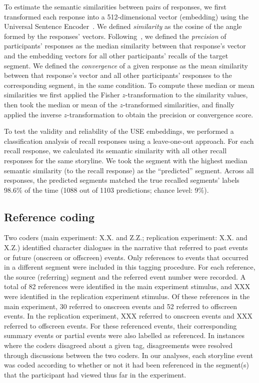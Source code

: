 \documentclass[10pt]{article}
\begin{document}
To estimate the semantic similarities between pairs of responses, we first
transformed each response into a 512-dimensional vector (embedding) using the
Universal Sentence Encoder~\citep[Transformer USE, ][]{CerEtal18}. We defined
\textit{similarity} as the cosine of the angle formed by the responses'
vectors. Following~\cite{HeusEtal21}, we defined the \textit{precision} of
participants' responses as the median similarity between that response's vector
and the embedding vectors for all other participants' recalls of the target
segment. We defined the \textit{convergence} of a given response as the mean
similarity between that response's vector and all other participants' responses
to the corresponding segment, in the same condition. To compute these median or
mean similarities we first applied the Fisher $z$-transformation to the
similarity values, then took the median or mean of the $z$-transformed
similarities, and finally applied the inverse $z$-transformation to obtain the
precision or convergence score.

To test the validity and reliability of the USE embeddings, we performed a
classification analysis of recall responses using a leave-one-out approach. For
each recall response, we calculated its semantic similarity with all other
recall responses for the same storyline. We took the segment with the highest
median semantic similarity (to the recall response) as the ``predicted''
segment. Across all responses, the predicted segments matched the true recalled
segments' labels 98.6\% of the time (1088 out of 1103 predictions; chance
level: 9\%).

\subsection*{Reference coding}

Two coders (main experiment: X.X. and Z.Z.; replication experiment: X.X. and
X.Z.) identified character dialogues in the narrative that referred to past
events or future (onscreen or offscreen) events. Only references to events that
occurred in a different segment were included in this tagging procedure. For
each reference, the source (referring) segment and the referred event number
were recorded. A total of 82 references were identified in the main experiment
stimulus, and XXX were identified in the replication experiment stimulus. Of
these references in the main experiment, 30 referred to onscreen events and 52
referred to offscreen events. In the replication experiment, XXX referred to
onscreen events and XXX referred to offscreen events. For these referenced
events, their corresponding summary events or partial events were also labelled
as referenced. In instances where the coders disagreed about a given tag,
disagreements were resolved through discussions between the two coders. In our
analyses, each storyline event was coded according to whether or not it had
been referenced in the segment(s) that the participant had viewed thus far in
the experiment.
\end{document}
